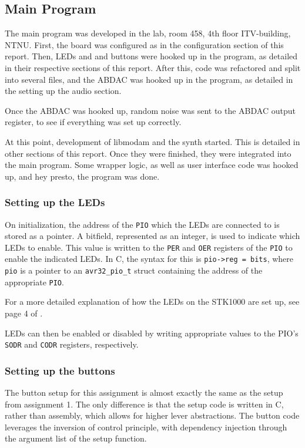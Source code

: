 \subsection{Main Program}

The main program was developed in the lab, room 458, 4th floor ITV-building, NTNU.
First, the board was configured as in the configuration section of this report.
Then, LEDs and and buttons were hooked up in the program, as detailed in their respective sections of this report.
After this, code was refactored and split into several files, and the ABDAC was hooked up in the program, as detailed in the setting up the audio section.

Once the ABDAC was hooked up, random noise was sent to the ABDAC output register, to see if everything was set up correctly.

At this point, development of libmodam and the synth started. This is detailed in other sections of this report. Once they were finished, they were integrated into the main program.
Some wrapper logic, as well as user interface code was hooked up, and hey presto, the program was done.


\subsubsection{Setting up the LEDs}
	On initialization, the address of the \texttt{PIO} which the LEDs are connected to is stored as a pointer.
	A bitfield, represented as an integer, is used to indicate which LEDs to enable.
	This value is written to the \texttt{PER} and \texttt{OER} registers of the \texttt{PIO} to enable the indicated LEDs.
	In C, the syntax for this is \texttt{pio->reg = bits}, where \texttt{pio} is a pointer to an \texttt{avr32_pio_t} struct containing the address of the appropriate \texttt{PIO}.

	For a more detailed explanation of how the LEDs on the STK1000 are set up, see page 4 of \cite{tdt4258-1}.

	LEDs can then be enabled or disabled by writing appropriate values to the PIO's \texttt{SODR} and \texttt{CODR} registers, respectively.
	
\subsubsection{Setting up the buttons}

The button setup for this assignment is almost exactly the same as the setup from assignment 1\cite{tdt4258-1}.
The only difference is that the setup code is written in C, rather than assembly, which allows for higher lever abstractions.
The button code leverages the inversion of control principle, with dependency injection through the argument list of the setup function.

